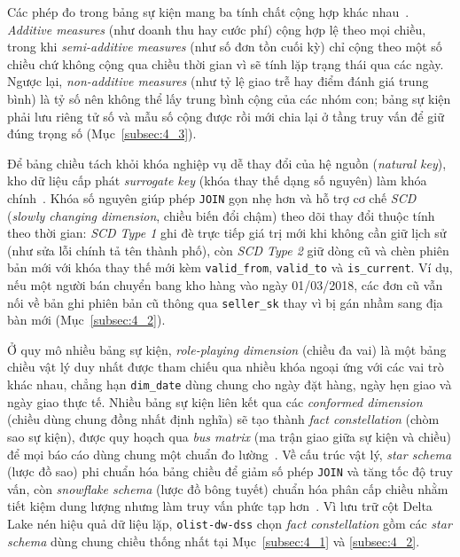 \documentclass[a4paper]{article}
\begin{document}
Các phép đo trong bảng sự kiện mang ba tính chất cộng hợp khác nhau~\cite{bib:kimball2013}. \textit{Additive measures} (như doanh thu hay cước phí) cộng hợp lệ theo mọi chiều, trong khi \textit{semi-additive measures} (như số đơn tồn cuối kỳ) chỉ cộng theo một số chiều chứ không cộng qua chiều thời gian vì sẽ tính lặp trạng thái qua các ngày. Ngược lại, \textit{non-additive measures} (như tỷ lệ giao trễ hay điểm đánh giá trung bình) là tỷ số nên không thể lấy trung bình cộng của các nhóm con; bảng sự kiện phải lưu riêng tử số và mẫu số cộng được rồi mới chia lại ở tầng truy vấn để giữ đúng trọng số (Mục~\ref{subsec:4_3}).

Để bảng chiều tách khỏi khóa nghiệp vụ dễ thay đổi của hệ nguồn (\textit{natural key}), kho dữ liệu cấp phát \textit{surrogate key} (khóa thay thế dạng số nguyên) làm khóa chính~\cite{bib:kimball2013}. Khóa số nguyên giúp phép \texttt{JOIN} gọn nhẹ hơn và hỗ trợ cơ chế \textit{SCD} (\textit{slowly changing dimension}, chiều biến đổi chậm) theo dõi thay đổi thuộc tính theo thời gian: \textit{SCD Type 1} ghi đè trực tiếp giá trị mới khi không cần giữ lịch sử (như sửa lỗi chính tả tên thành phố), còn \textit{SCD Type 2} giữ dòng cũ và chèn phiên bản mới với khóa thay thế mới kèm \texttt{valid\_from}, \texttt{valid\_to} và \texttt{is\_current}. Ví dụ, nếu một người bán chuyển bang kho hàng vào ngày 01/03/2018, các đơn cũ vẫn nối về bản ghi phiên bản cũ thông qua \texttt{seller\_sk} thay vì bị gán nhầm sang địa bàn mới (Mục~\ref{subsec:4_2}).

Ở quy mô nhiều bảng sự kiện, \textit{role-playing dimension} (chiều đa vai) là một bảng chiều vật lý duy nhất được tham chiếu qua nhiều khóa ngoại ứng với các vai trò khác nhau, chẳng hạn \texttt{dim\_date} dùng chung cho ngày đặt hàng, ngày hẹn giao và ngày giao thực tế. Nhiều bảng sự kiện liên kết qua các \textit{conformed dimension} (chiều dùng chung đồng nhất định nghĩa) sẽ tạo thành \textit{fact constellation} (chòm sao sự kiện), được quy hoạch qua \textit{bus matrix} (ma trận giao giữa sự kiện và chiều) để mọi báo cáo dùng chung một chuẩn đo lường~\cite{bib:kimball2013}. Về cấu trúc vật lý, \textit{star schema} (lược đồ sao) phi chuẩn hóa bảng chiều để giảm số phép \texttt{JOIN} và tăng tốc độ truy vấn, còn \textit{snowflake schema} (lược đồ bông tuyết) chuẩn hóa phân cấp chiều nhằm tiết kiệm dung lượng nhưng làm truy vấn phức tạp hơn~\cite{bib:kimball2013,bib:golfarelli1998}. Vì lưu trữ cột Delta Lake nén hiệu quả dữ liệu lặp, \texttt{olist-dw-dss} chọn \textit{fact constellation} gồm các \textit{star schema} dùng chung chiều thống nhất tại Mục~\ref{subsec:4_1} và \ref{subsec:4_2}.
\end{document}
